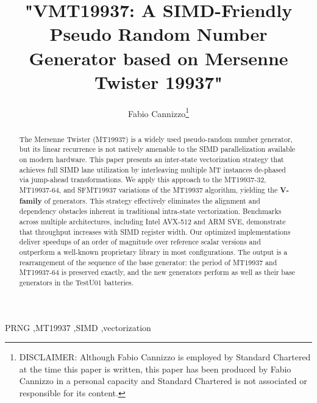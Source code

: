 \documentclass[preprint,1p,times]{elsarticle}
\begin{document}
\newcommand {\inred}[1] {\textcolor{red}{#1}}
\newcommand\XOR{\mathbin{\oplus}}
\newcommand\OR{\mid}
\newcommand\AND{\&}
\newcommand\myceil[1]{\left\lceil{#1}\right\rceil}
\newcommand\SHL{\lll}
\newcommand\SHR{\ggg}



\begin{frontmatter}
\title{"VMT19937: A SIMD-Friendly Pseudo Random Number Generator based on Mersenne Twister 19937"}

\author{\renewcommand*{\thefootnote}{\fnsymbol{footnote}}
	Fabio Cannizzo\footnote{DISCLAIMER: Although Fabio Cannizzo is employed by Standard Chartered at the time this paper is written, this paper has been produced by Fabio Cannizzo in a personal capacity and Standard Chartered is not associated or responsible for its content.}}

\begin{abstract}
The Mersenne Twister (MT19937) is a widely used pseudo-random number generator, but its linear recurrence is not natively amenable to the SIMD parallelization available on modern hardware. This paper presents an inter-state vectorization strategy that achieves full SIMD lane utilization by interleaving multiple MT instances de-phased via jump-ahead transformations. We apply this approach to the MT19937-32, MT19937-64, and SFMT19937 variations of the MT19937 algorithm, yielding the \textbf{V-family} of generators. This strategy effectively eliminates the alignment and dependency obstacles inherent in traditional intra-state vectorization. Benchmarks across multiple architectures, including Intel AVX-512 and ARM SVE, demonstrate that throughput increases with SIMD register width. Our optimized implementations deliver speedups of an order of magnitude over reference scalar versions and outperform a well-known proprietary library in most configurations. The output is a rearrangement of the sequence of the base generator: the period of MT19937 and MT19937-64 is preserved exactly, and the new generators perform as well as their base generators in the TestU01 batteries.
\end{abstract}

\begin{keyword}
PRNG \sep MT19937 \sep SIMD \sep vectorization
\end{keyword}

\end{frontmatter}
\end{document}
